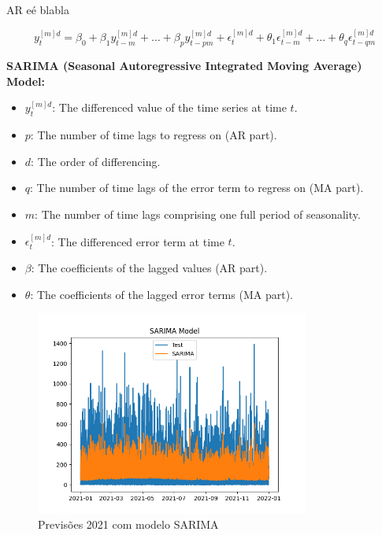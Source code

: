 AR eé blabla

\begin{equation} \label{eq:SARIMA} y_t^{[m]d} = \beta_0 + \beta_1 y_{t-m}^{[m]d} + \dots + \beta_p y_{t-pm}^{[m]d} + \epsilon_t^{[m]d} + \theta_1 \epsilon_{t-m}^{[m]d} + \dots + \theta_q \epsilon_{t-qm}^{[m]d} \end{equation}

\textbf{SARIMA (Seasonal Autoregressive Integrated Moving Average) Model:}
\begin{itemize}
  \item $y_t^{[m]d}$: The differenced value of the time series at time $t$.
  \item $p$: The number of time lags to regress on (AR part).
  \item $d$: The order of differencing.
  \item $q$: The number of time lags of the error term to regress on (MA part).
  \item $m$: The number of time lags comprising one full period of seasonality.
  \item $\epsilon_t^{[m]d}$: The differenced error term at time $t$.
  \item $\beta$: The coefficients of the lagged values (AR part).
  \item $\theta$: The coefficients of the lagged error terms (MA part).
\end{itemize}

\begin{figure}[H]
    \centering
    \includegraphics[width=0.8\textwidth]{../plots/SARIMA_model.png}
    \caption{Previsões 2021 com modelo SARIMA}
    \label{fig:SARIMA_model}
\end{figure}


